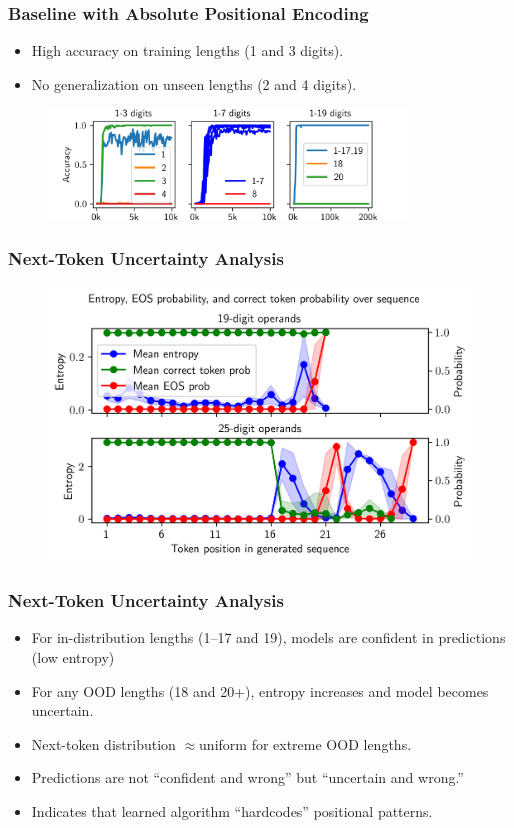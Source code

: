\documentclass[14pt,aspectratio=169]{beamer}
\theoremstyle{remark}
\begin{document}
\begin{frame}
    \frametitle{Baseline with Absolute Positional Encoding}
    \begin{itemize}
        \item High accuracy on training lengths (1 and 3 digits).
        \item No generalization on unseen lengths (2 and 4 digits).
    \end{itemize}
    \begin{figure}
        \centering
        \includegraphics[width=0.85\textwidth]{fig/baseline_and_longer.png}
    \end{figure}
\end{frame}

\begin{frame}
    \frametitle{Next-Token Uncertainty Analysis}
    \begin{figure}
        \centering
        \includegraphics[width=0.65\linewidth]{fig/next_token_entropy.png}
    \end{figure}
\end{frame}

\begin{frame}
    \frametitle{Next-Token Uncertainty Analysis}
    \begin{itemize}
        \item For in-distribution lengths (1--17 and 19), models are confident in predictions (low entropy)
        \item For any OOD lengths (18 and 20+), entropy increases and model becomes uncertain.
        \item Next-token distribution $\approx$uniform for extreme OOD lengths.
        \item Predictions are not ``confident and wrong'' but ``uncertain and wrong.''
        \item Indicates that learned algorithm ``hardcodes'' positional patterns.
    \end{itemize}
\end{frame}
\end{document}

